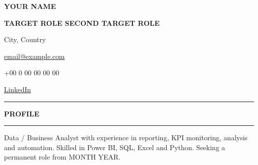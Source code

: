 \documentclass[10pt,a4paper]{article}
\newcommand{\sectiontitle}[1]{%
  \vspace{0.10cm}%
  {\fontsize{10.5pt}{11.1pt}\selectfont
  \bfseries #1}\par
  \vspace{-0.06cm}%
  {\color{accent}\rule{\linewidth}{0.55pt}}\par
  \vspace{0.02cm}%
}
\begin{document}
\fontsize{8.2pt}{9.1pt}\selectfont


{\centering

{\fontsize{25pt}{27pt}\selectfont
\bfseries
YOUR NAME}\par

\vspace{0.07cm}

{\fontsize{10.2pt}{10.8pt}\selectfont
\bfseries
TARGET ROLE
\textbar{}
SECOND TARGET ROLE}\par

\vspace{0.06cm}

{\fontsize{7.7pt}{8.2pt}\selectfont
City, Country

\hspace{0.5em}
\textbar{}
\hspace{0.5em}

\href{mailto:email@example.com}{
email@example.com
}

\hspace{0.5em}
\textbar{}
\hspace{0.5em}

+00 0 00 00 00 00

\hspace{0.5em}
\textbar{}
\hspace{0.5em}

\href{
https://linkedin.com/in/your-profile
}{
LinkedIn
}

}\par
}

\vspace{0.06cm}

{\color{accent}
\rule{\textwidth}{1pt}}


\sectiontitle{PROFILE}

{\fontsize{8.2pt}{9.15pt}\selectfont
Data / Business Analyst with experience in
reporting, KPI monitoring, analysis and automation.
Skilled in Power BI, SQL, Excel and Python.
Seeking a permanent role from MONTH YEAR.
}\par

\end{document}
